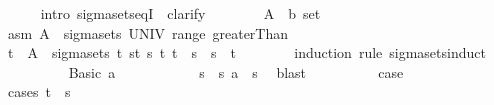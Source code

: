 \begin{isabellebody}
\ \ \ \ \isamarkupfalse%
\ {\isacharparenleft}{\kern0pt}intro\ sigma{\isacharunderscore}{\kern0pt}sets{\isacharunderscore}{\kern0pt}eqI\ {\isacharsemicolon}{\kern0pt}\ clarify{\isacharparenright}{\kern0pt}\isanewline
\ \ \ \ \ \ \isamarkupfalse%
\ A\ {\isacharcolon}{\kern0pt}{\isacharcolon}{\kern0pt}\ {\isachardoublequoteopen}{\isacharprime}{\kern0pt}b\ set{\isachardoublequoteclose}\ \isamarkupfalse%
\ asm{\isacharcolon}{\kern0pt}\ {\isachardoublequoteopen}A\ {\isasymin}\ sigma{\isacharunderscore}{\kern0pt}sets\ UNIV\ {\isacharparenleft}{\kern0pt}range\ greaterThan{\isacharparenright}{\kern0pt}{\isachardoublequoteclose}\isanewline
\ \ \ \ \ \ \isamarkupfalse%
\ {\isachardoublequoteopen}{\isacharbraceleft}{\kern0pt}t\ {\isasyminter}\ A\ {\isasymin}\ sigma{\isacharunderscore}{\kern0pt}sets\ {\isacharbraceleft}{\kern0pt}t\ {\isacharbraceleft}{\kern0pt}{\isacharbraceleft}{\kern0pt}s{\isacharless}{\kern0pt}{\isachardot}{\kern0pt}{\isachardot}{\kern0pt}t{\isacharbraceright}{\kern0pt}\ {\isacharbar}{\kern0pt}s\ t{\isachardot}{\kern0pt}\ t\ {\isasymle}\ s\ {\isasymand}\ s\ {\isacharless}{\kern0pt}\ t{\isacharbraceright}{\kern0pt}{\isachardoublequoteclose}\isanewline
\ \ \ \ \ \ \isamarkupfalse%
\ {\isacharparenleft}{\kern0pt}induction\ rule{\isacharcolon}{\kern0pt}\ sigma{\isacharunderscore}{\kern0pt}sets{\isachardot}{\kern0pt}induct{\isacharparenright}{\kern0pt}\isanewline
\ \ \ \ \ \ \ \ \isamarkupfalse%
\ {\isacharparenleft}{\kern0pt}Basic\ a{\isacharparenright}{\kern0pt}\isanewline
\ \ \ \ \ \ \ \ \isamarkupfalse%
\ \isamarkupfalse%
\ s\ \ s{\isacharcolon}{\kern0pt}\ {\isachardoublequoteopen}a\ {\isacharequal}{\kern0pt}\ {\isacharbraceleft}{\kern0pt}s{\isacharless}{\kern0pt}{\isachardot}{\kern0pt}{\isachardot}{\kern0pt}{\isacharbraceright}{\kern0pt}{\isachardoublequoteclose}\ \isamarkupfalse%
\ blast\isanewline
\ \ \ \ \ \ \ \ \isamarkupfalse%
\ {\isacharquery}{\kern0pt}case\isanewline
\ \ \ \ \ \ \ \ \isamarkupfalse%
\ {\isacharparenleft}{\kern0pt}cases\ {\isachardoublequoteopen}t\ {\isasymle}\ s{\isachardoublequoteclose}{\isacharparenright}{\kern0pt}\isanewline
\ \ \ \ \ \ \ \ \ \ \isamarkupfalse%

\end{isabellebody}
